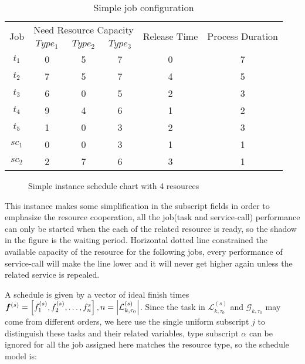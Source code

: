 \begin{table}[htbp]
  \centering
  \scriptsize
  \caption{Simple job configuration}
    \begin{tabular}{cccccc}
    \toprule
    \multicolumn{1}{c}{\multirow{2}[0]{*}{ Job}} & \multicolumn{3}{c}{Need Resource Capacity} & \multicolumn{1}{c}{\multirow{2}[0]{*}{Release Time}} & \multicolumn{1}{c}{\multirow{2}[0]{*}{Process Duration}} \\
    \multicolumn{1}{c}{} & $Type_1$ & $Type_2$ & $Type_3$ & \multicolumn{1}{c}{} & \multicolumn{1}{c}{} \\
    \midrule
    $t_1$ & 0     & 5     & 7     & 0     & 7 \\
    $t_2$ & 7     & 5     & 7     & 4     & 5 \\
    $t_3$ & 6     & 0     & 5     & 2     & 3 \\
    $t_4$ & 9	 & 4  & 6 & 1 &2 \\
    $t_5$ & 1 & 0 & 3 & 2 & 3\\
    $sc_1$ & 0     & 0     & 3    & 1     & 1 \\
    $sc_2$ & 2     & 7     & 6     & 3     & 1 \\
    \bottomrule
    \end{tabular}%
  \label{tab:simplejobconfiguration}%
\end{table}%
\begin{figure}[htbp]
	\centering
	\resizebox{.8\textwidth}{!}{}
	\caption{Simple instance schedule chart with 4 resources}
	\label{fig:scheduleChart}
\end{figure}
This instance makes some simplification in the subscript fields in order to emphasize the resource cooperation, all the job(task and service-call) performance can only be started when the each of the related resource is ready, so the shadow in the figure is the waiting period. Horizontal dotted line constrained the available capacity of the resource for the following jobs, every performance of service-call will make the line lower and it will never get higher again unless the related service is repealed.


A schedule is given by a vector of ideal finish times $\bm{f}^{(s)} = \left[f_1^{(s)}, f_2^{(s)},\dots,f^{s}_n\right],n=\left|\mathcal{L}^{(s)}_{k,\tau_0}\right|$. Since the task in $\mathcal{L}^{(s)}_{k,\tau_0}$ and $\mathcal{G}_{k,\tau_0}$ may come from different orders, we here use the single uniform subscript $j$ to distinguish these tasks and their related variables, type subscript $\alpha$ can be ignored for all the job assigned here matches the resource type, so the schedule model is:

